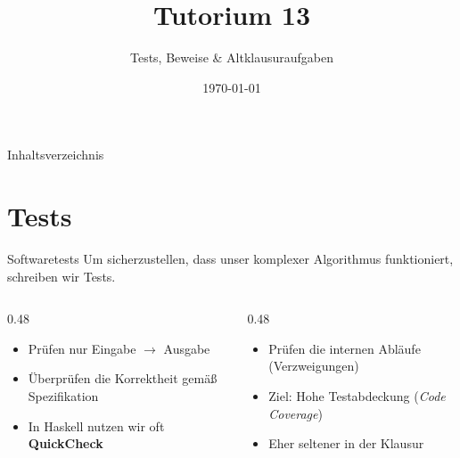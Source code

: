 \documentclass[aspectratio=169,11pt]{beamer}
\title{\textbf{Tutorium 13}}
\subtitle{Tests, Beweise \& Altklausuraufgaben}
\institute{Grundlagen der Praktischen Informatik}
\author{}
\date{\today}
\begin{document}
\begin{frame}[plain]
    \titlepage
\end{frame}

\begin{frame}{Inhaltsverzeichnis}
    \tableofcontents
\end{frame}

\section{Tests}

\begin{frame}{Softwaretests}
    Um sicherzustellen, dass unser komplexer Algorithmus funktioniert, schreiben wir Tests.
    
    \begin{columns}[T]
        \begin{column}{0.48\textwidth}
            \begin{tcolorbox}[modernbox, title=\faBox\ Blackbox-Tests]
                \begin{itemize}
                    \item Prüfen nur Eingabe $\rightarrow$ Ausgabe
                    \item Überprüfen die Korrektheit gemäß Spezifikation
                    \item In Haskell nutzen wir oft \textbf{QuickCheck}
                \end{itemize}
            \end{tcolorbox}
        \end{column}
        \begin{column}{0.48\textwidth}
            \begin{tcolorbox}[modernbox, title=\faSearch\ Whitebox-Tests]
                \begin{itemize}
                    \item Prüfen die internen Abläufe (Verzweigungen)
                    \item Ziel: Hohe Testabdeckung (\textit{Code Coverage})
                    \item Eher seltener in der Klausur
                \end{itemize}
            \end{tcolorbox}
        \end{column}
    \end{columns}
\end{frame}
\end{document}
